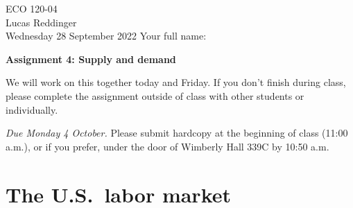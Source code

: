 \documentclass[
    letterpaper,paper=portrait,fleqn,
    DIV=16,fontsize=12pt,twoside=semi,
    parskip=full-,
    headings=standardclasses]
{scrartcl}
\begin{document}
\RaggedRight
\thispagestyle{plain}

ECO 120-04 \\
Lucas Reddinger \\
Wednesday 28 September 2022 \hfill Your full name: \underline{\hspace{3.25in}}

\vspace{0.7\baselineskip}
\textbf{\LARGE Assignment 4: Supply and demand}
\vspace{0.3\baselineskip}

We will work on this together today and Friday. If you don't finish during class, please complete the assignment outside of class with other students or individually.

\emph{Due Monday 4 October.} Please submit hardcopy at the beginning of class (11:00 a.m.), or if you prefer, under the door of Wimberly Hall 339C by 10:50 a.m.

\section*{The U.S.~labor market}
\end{document}
